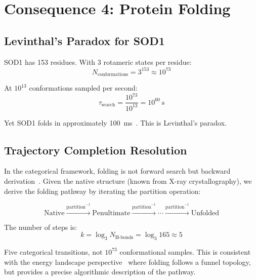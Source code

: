\documentclass[twocolumn,aps,prx,superscriptaddress,longbibliography]{revtex4-2}
\theoremstyle{remark}
\begin{document}
\section{Consequence 4: Protein Folding}
\label{sec:folding}

\subsection{Levinthal's Paradox for SOD1}

SOD1 has 153 residues. With 3 rotameric states per residue:
\begin{equation}
N_\text{conformations} = 3^{153} \approx 10^{73}
\end{equation}

At $10^{13}$ conformations sampled per second:
\begin{equation}
\tau_\text{search} = \frac{10^{73}}{10^{13}} = 10^{60}~\text{s}
\end{equation}

Yet SOD1 folds in approximately 100~ms~\cite{Lindberg2002}. This is
Levinthal's paradox.

\subsection{Trajectory Completion Resolution}

In the categorical framework, folding is not forward search but backward
derivation~\cite{Anfinsen1973,Dobson2003}. Given the native structure
(known from X-ray crystallography), we derive the folding pathway by
iterating the partition operation:

\begin{equation}
\text{Native} \xrightarrow{\text{partition}^{-1}} \text{Penultimate}
\xrightarrow{\text{partition}^{-1}} \cdots \xrightarrow{\text{partition}^{-1}}
\text{Unfolded}
\end{equation}

The number of steps is:
\begin{equation}
k = \log_3 N_\text{H-bonds} = \log_3 165 \approx 5
\end{equation}

Five categorical transitions, not $10^{73}$ conformational samples. This
is consistent with the energy landscape perspective~\cite{Bryngelson1995,Onuchic1997}
where folding follows a funnel topology, but provides a precise
algorithmic description of the pathway.
\end{document}
